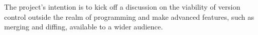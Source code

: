 The project's intention is to kick off a discussion on the viability of version control outside the realm of programming and make advanced features, such as merging and diffing, available to a wider audience.







